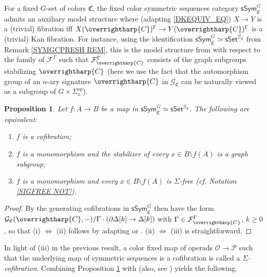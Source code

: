 \documentclass[a4paper,10pt]{article}%
\numberwithin{equation}{section}
\numberwithin{figure}{section}
\newtheorem{proposition}[equation]{Proposition}%
\theoremstyle{definition} %
\newcommand{\vect}[1]{\text{\overrightharp{\ensuremath{#1}}}}
\renewcommand{\O}{\ensuremath{\mathcal O}}
\newcommand{\1}{\ensuremath{\mathbbm 1}}%
\begin{document}
	For a fixed $G$-set of colors $\mathfrak{C}$,
	the 
	fixed color symmetric sequences
	category
	$\mathsf{sSym}_{\mathfrak{C}}^G$
	admits an auxiliary model structure where
	(adapting \eqref{DKEQUIV_EQ})
	$X \to Y$ is a (trivial) fibration
	iff 
	$X(\vect{C})^{\Gamma} \to Y(\vect{C})^{\Gamma}$
	is a (trivial) Kan fibration.
	For instance, using the identification
	$\mathsf{sSym}^{G}_{\mathfrak{C}}
	\simeq \mathsf{sSet}^{\mathcal{G}_{\mathfrak{C}}}$
	from Remark \ref{SYMGCPRESH REM},
	this is the model structure
	from \cite[Prop. 3.17]{BP_HGOP}
	with respect to the family of 
	$\mathcal{F}^{\Gamma}$
	such that
	$\mathcal{F}^{\Gamma}_{\vect{C}}$
	consists of the graph subgroups stabilizing $\vect{C}$
	(here we use the fact that the automorphism group of 
	an $n$-ary signature $\vect{C}$ in 
	$\mathcal{G}_{\mathfrak{C}}$
	can be naturally viewed as a subgroup of 
	$G \times \Sigma_n^{op}$).




\begin{proposition}\label{SSYMCOFCH PROP}
	Let $f \colon A \to B$ be a map in
	$\mathsf{sSym}^G_{\mathfrak{C}} \simeq \mathsf{sSet}^{\mathcal{G}_{\mathfrak{C}}}$.
	The following are equivalent:
\begin{enumerate}
	\item[(i)] $f$ is a cofibration;
	\item[(ii)] $f$ is a monomorphism and the stabilizer of every
	$x \in B \setminus f(A)$
	is a graph subgroup;
	\item[(iii)] $f$ is a monomorphism and every 
	$x \in B \setminus f(A)$ is $\Sigma$-free
	(cf. Notation \ref{SIGFREE NOT}).
\end{enumerate}
\end{proposition}

\begin{proof}
By \cite[Rem. 3.14]{BP_HGOP}
the generating cofibrations in 
$\mathsf{sSym}^G_{\mathfrak{C}}$
then have the form
$\mathcal{G}_{\mathfrak{C}}
(\vect{C},-)/\Gamma \cdot (\partial \Delta[k] \to \Delta[k])$
with $\Gamma \in \mathcal{F}^{\Gamma}_{\vect{C}}$,
$k \geq 0$,
so that (i) $\Leftrightarrow$ (ii)
follows by adapting 
\cite[Prop. 2.16]{Ste16}
or
\cite[Prop. 6.5]{Per18}.
(ii) $\Leftrightarrow$ (iii)
is straightforward.
\end{proof}



In light of (iii) in the previous result,
a color fixed map of operads
$\O \to \mathcal{P}$
such that the underlying map of symmetric sequences is a cofibration
is called a \emph{$\Sigma$-cofibration}.
%
Combining Proposition \ref{SSYMCOFCH PROP} with \cite[Prop. 3.63]{BP_HGOP} (also, see 
\cite[Prop. 4.11(ii)]{BP_HGOP})
yields the following.
\end{document}
